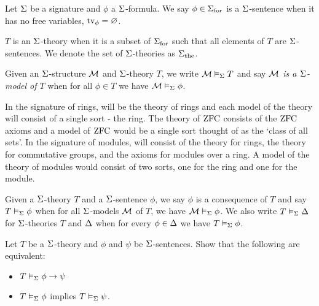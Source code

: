 \begin{dfn}
    Let $\Sigma$ be a signature and $\phi$ a $\Sigma$-formula.
    We say $\phi \in {\Sigma}_\mathrm{for}$ is a $\Sigma$-sentence when
    it has no free variables, $\textrm{tv}_{\phi} = \varnothing$.

    $T$ is an $\Sigma$-theory when it is a subset of ${\Sigma}_\mathrm{for}$
    such that all elements of $T$ are $\Sigma$-sentences.
    We denote the set of $\Sigma$-theories as ${\Sigma}_\mathrm{the}$.
\end{dfn}

\begin{dfn}[Models]
    Given an $\Sigma$-structure $\mathcal{M}$ and $\Sigma$-theory $T$,
    we write $\mathcal{M} \vDash_{\Sigma} T$ and say
    \emph{$\mathcal{M}$ is a $\Sigma$-model of $T$} when
    for all $\phi \in T$ we have $\mathcal{M} \vDash_{\Sigma} \phi$.
\end{dfn}

\begin{eg}
    In the signature of rings,
     will be the theory
    of rings and each model of the theory will consist of a single sort - the ring.
    The %
    theory of $\operatorname{ZFC}$ %
    consists of the $\operatorname{ZFC}$ axioms and a model of $\operatorname{ZFC}$
    would be a single sort thought of as the `class of all sets'.
    In the signature of modules,
     will consist of the theory for rings,
    the theory for commutative groups, and the axioms for modules over a ring.
    A model of the theory of modules would consist of two sorts,
    one for the ring and one for the module.
\end{eg}

\begin{dfn}[Consequence]
    Given a $\Sigma$-theory $T$
    and a $\Sigma$-sentence $\phi$,
    we say $\phi$ is a consequence of $T$
    and say $T \vDash_{\Sigma} \phi$
    when for all $\Sigma$-models $\mathcal{M}$ of $T$,
    we have $\mathcal{M} \vDash_{\Sigma} \phi$.
    We also write $T \vDash_{\Sigma} \Delta$
    for $\Sigma$-theories $T$ and $\Delta$
    when for every $\phi \in \Delta$ we have $T \vDash_{\Sigma} \phi$.
\end{dfn}

\begin{ex}
    Let $T$ be a $\Sigma$-theory and $\phi$ and $\psi$ be $\Sigma$-sentences.
    Show that the following are equivalent:
    \begin{itemize}
        \item $T \vDash_{\Sigma} \phi \to \psi$
        \item $T \vDash_{\Sigma} \phi$ implies $T \vDash_{\Sigma} \psi$.
    \end{itemize}
\end{ex}

